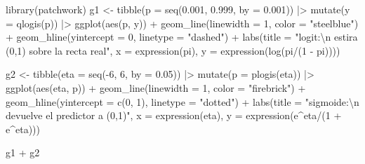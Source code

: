 \documentclass[
  letterpaper,
  DIV=11,
  numbers=noendperiod]{scrartcl}
\newenvironment{Shaded}{\begin{snugshade}}{\end{snugshade}}
\newcommand{\AttributeTok}[1]{\textcolor[rgb]{0.40,0.45,0.13}{#1}}
\newcommand{\DecValTok}[1]{\textcolor[rgb]{0.68,0.00,0.00}{#1}}
\newcommand{\FloatTok}[1]{\textcolor[rgb]{0.68,0.00,0.00}{#1}}
\newcommand{\FunctionTok}[1]{\textcolor[rgb]{0.28,0.35,0.67}{#1}}
\newcommand{\NormalTok}[1]{\textcolor[rgb]{0.00,0.23,0.31}{#1}}
\newcommand{\OtherTok}[1]{\textcolor[rgb]{0.00,0.23,0.31}{#1}}
\newcommand{\SpecialCharTok}[1]{\textcolor[rgb]{0.37,0.37,0.37}{#1}}
\newcommand{\StringTok}[1]{\textcolor[rgb]{0.13,0.47,0.30}{#1}}
\begin{document}
\begin{Shaded}
\begin{Highlighting}[]
\FunctionTok{library}\NormalTok{(patchwork)}
\NormalTok{g1 }\OtherTok{\textless{}{-}} \FunctionTok{tibble}\NormalTok{(}\AttributeTok{p =} \FunctionTok{seq}\NormalTok{(}\FloatTok{0.001}\NormalTok{, }\FloatTok{0.999}\NormalTok{, }\AttributeTok{by =} \FloatTok{0.001}\NormalTok{)) }\SpecialCharTok{|\textgreater{}}
  \FunctionTok{mutate}\NormalTok{(}\AttributeTok{y =} \FunctionTok{qlogis}\NormalTok{(p)) }\SpecialCharTok{|\textgreater{}}
  \FunctionTok{ggplot}\NormalTok{(}\FunctionTok{aes}\NormalTok{(p, y)) }\SpecialCharTok{+}
  \FunctionTok{geom\_line}\NormalTok{(}\AttributeTok{linewidth =} \DecValTok{1}\NormalTok{, }\AttributeTok{color =} \StringTok{"steelblue"}\NormalTok{) }\SpecialCharTok{+}
  \FunctionTok{geom\_hline}\NormalTok{(}\AttributeTok{yintercept =} \DecValTok{0}\NormalTok{, }\AttributeTok{linetype =} \StringTok{"dashed"}\NormalTok{) }\SpecialCharTok{+}
  \FunctionTok{labs}\NormalTok{(}\AttributeTok{title =} \StringTok{"logit:}\SpecialCharTok{\textbackslash{}n}\StringTok{ estira (0,1) sobre la recta real"}\NormalTok{,}
       \AttributeTok{x =} \FunctionTok{expression}\NormalTok{(pi), }\AttributeTok{y =} \FunctionTok{expression}\NormalTok{(}\FunctionTok{log}\NormalTok{(pi}\SpecialCharTok{/}\NormalTok{(}\DecValTok{1} \SpecialCharTok{{-}}\NormalTok{ pi))))}

\NormalTok{g2 }\OtherTok{\textless{}{-}} \FunctionTok{tibble}\NormalTok{(}\AttributeTok{eta =} \FunctionTok{seq}\NormalTok{(}\SpecialCharTok{{-}}\DecValTok{6}\NormalTok{, }\DecValTok{6}\NormalTok{, }\AttributeTok{by =} \FloatTok{0.05}\NormalTok{)) }\SpecialCharTok{|\textgreater{}}
  \FunctionTok{mutate}\NormalTok{(}\AttributeTok{p =} \FunctionTok{plogis}\NormalTok{(eta)) }\SpecialCharTok{|\textgreater{}}
  \FunctionTok{ggplot}\NormalTok{(}\FunctionTok{aes}\NormalTok{(eta, p)) }\SpecialCharTok{+}
  \FunctionTok{geom\_line}\NormalTok{(}\AttributeTok{linewidth =} \DecValTok{1}\NormalTok{, }\AttributeTok{color =} \StringTok{"firebrick"}\NormalTok{) }\SpecialCharTok{+}
  \FunctionTok{geom\_hline}\NormalTok{(}\AttributeTok{yintercept =} \FunctionTok{c}\NormalTok{(}\DecValTok{0}\NormalTok{, }\DecValTok{1}\NormalTok{), }\AttributeTok{linetype =} \StringTok{"dotted"}\NormalTok{) }\SpecialCharTok{+}
  \FunctionTok{labs}\NormalTok{(}\AttributeTok{title =} \StringTok{"sigmoide:}\SpecialCharTok{\textbackslash{}n}\StringTok{ devuelve el predictor a (0,1)"}\NormalTok{,}
       \AttributeTok{x =} \FunctionTok{expression}\NormalTok{(eta), }\AttributeTok{y =} \FunctionTok{expression}\NormalTok{(e}\SpecialCharTok{\^{}}\NormalTok{eta}\SpecialCharTok{/}\NormalTok{(}\DecValTok{1} \SpecialCharTok{+}\NormalTok{ e}\SpecialCharTok{\^{}}\NormalTok{eta)))}

\NormalTok{g1 }\SpecialCharTok{+}\NormalTok{ g2}
\end{Highlighting}
\end{Shaded}
\end{document}
